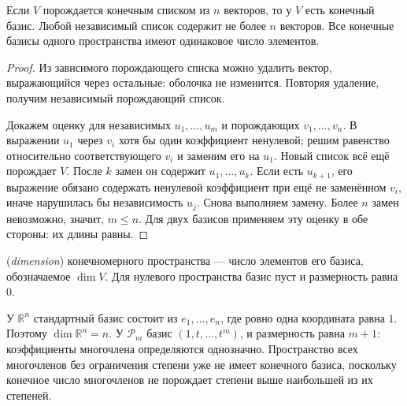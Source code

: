 \ifdim\dimexpr\ht\CatFlowBox+\dp\CatFlowBox\relax<64mm\dp\CatFlowBox=\dimexpr64mm-\ht\CatFlowBox\relax\fi%
\noindent\usebox{\CatFlowBox}\par\addvspace{5pt}
\begin{theorem}\label{thm:legacy-c26-3}
Если \(V\) порождается конечным списком из \(n\) векторов, то у \(V\) есть конечный базис. Любой независимый список содержит не более \(n\) векторов. Все конечные базисы одного пространства имеют одинаковое число элементов.
\end{theorem}
\begin{proof}
Из зависимого порождающего списка можно удалить вектор, выражающийся через остальные: оболочка не изменится. Повторяя удаление, получим независимый порождающий список.

Докажем оценку для независимых \(u_1,\ldots,u_m\) и порождающих \(v_1,\ldots,v_n\). В выражении \(u_1\) через \(v_i\) хотя бы один коэффициент ненулевой; решим равенство относительно соответствующего \(v_i\) и заменим его на \(u_1\). Новый список всё ещё порождает \(V\). После \(k\) замен он содержит \(u_1,\ldots,u_k\). Если есть \(u_{k+1}\), его выражение обязано содержать ненулевой коэффициент при ещё не заменённом \(v_i\), иначе нарушилась бы независимость \(u_j\). Снова выполняем замену. Более \(n\) замен невозможно, значит, \(m\le n\). Для двух базисов применяем эту оценку в обе стороны: их длины равны.
\end{proof}
\begin{definition} (\emph{dimension}) конечномерного пространства — число элементов его базиса, обозначаемое \(\dim V\). Для нулевого пространства базис пуст и размерность равна \(0\).\end{definition}
У \(\mathbb R^n\) стандартный базис состоит из \(e_1,\ldots,e_n\), где ровно одна координата равна \(1\). Поэтому \(\dim\mathbb R^n=n\). У \(\mathcal P_m\) базис \((1,t,\ldots,t^m)\), и размерность равна \(m+1\): коэффициенты многочлена определяются однозначно. Пространство всех многочленов без ограничения степени уже не имеет конечного базиса, поскольку конечное число многочленов не порождает степени выше наибольшей из их степеней.

